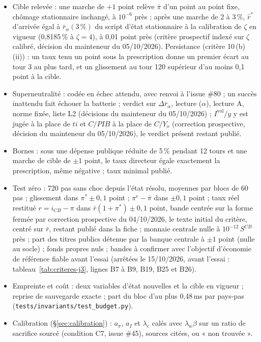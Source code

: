 \documentclass[11pt,a4paper]{article}
\begin{document}
\begin{proposee}
\begin{itemize}
\item Cible relevée : une marche de $+1$ point relève $\bar\pi$ d'un point au point fixe, chômage stationnaire inchangé, à $10^{-6}$ près ; après une marche de 2 à 3\,\%, $\hat r^\ast$ d'arrivée égal à $\bar r_\alpha(3\,\%)$ du script d'état stationnaire à la calibration de $\zeta$ en vigueur (0,8185\,\% à $\zeta = 4$), à 0,01 point près (critère prospectif indexé sur $\zeta$ calibré, décision du mainteneur du 05/10/2026). Persistance (critère 10\,(b)\,(ii)) : un taux tenu un point sous la prescription donne un premier écart au tour 3 au plus tard, et un glissement au tour 120 supérieur d'au moins 0,1 point à la cible.
\item Superneutralité : codée en échec attendu, avec renvoi à l'issue \#80 ; un succès inattendu fait échouer la batterie ; verdict sur $\Delta\bar r_\alpha$, lecture ($\alpha$), lecture A, norme fixée, liste L2 (décisions du mainteneur du 05/10/2026) ; $I^{\mathrm{vol}}/y$ y est jugée à la place de $\mathit{ti}$ et $C/\mathit{PIB}$ à la place de $C/Y_o$ (correction prospective, décision du mainteneur du 05/10/2026), le verdict présent restant publié.
\item Bornes : sous une dépense publique réduite de 5\,\% pendant 12 tours et une marche de cible de $\pm 1$ point, le taux directeur égale exactement la prescription, même négative ; taux minimal publié.
\item Test zéro : 720 pas sans choc depuis l'état résolu, moyennes par blocs de 60 pas ; glissement dans $\pi^\ast \pm 0{,}1$ point ; $\pi^e - \bar\pi$ dans $\pm 0{,}1$ point ; taux réel restitué $r = i_{\mathit{CB}} - \pi$ dans $\bar r(1 + \pi^\ast) \pm 0{,}1$ point, bande centrée sur la forme fermée par correction prospective du 04/10/2026, le texte initial du critère, centré sur $\bar r$, restant publié dans la fiche ; monnaie centrale nulle à $10^{-12}\,S^{\mathit{CB}}$ près ; part des titres publics détenue par la banque centrale à $\pm 1$ point (nulle au socle) ; fonds propres nuls ; bandes à confirmer avec l'objectif d'économie de référence fiable avant l'essai (arrêtées le 15/10/2026, avant l'essai : tableau~\ref{tab:criteres-j3}, lignes B7 à B9, B19, B25 et B26).
\item Empreinte et coût : deux variables d'état nouvelles et la cible en vigueur ; reprise de sauvegarde exacte ; part du bloc d'au plus 0,48\,ms par pays-pas (\nolinkurl{tests/invariants/test_budget.py}).
\item Calibration (\S\ref{sec:calibration}) : $a_\pi$, $a_I$ et $\lambda_e$ calés avec $\lambda_w\beta$ sur un ratio de sacrifice sourcé (condition C7, issue \#45), sources citées, ou « non trouvée ».
\end{itemize}


\end{proposee}
\end{document}
